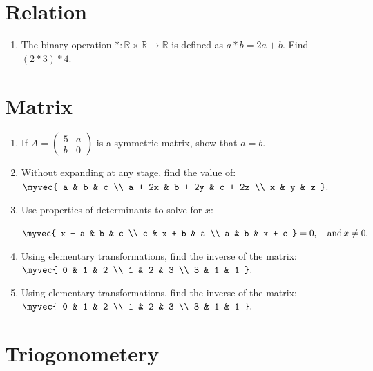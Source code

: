\documentclass[a4paper,12pt]{article}
\begin{document}
\section{Relation}

\begin{enumerate}
    

        \item The binary operation $\ast : \mathbb{R} \times \mathbb{R} \rightarrow \mathbb{R}$ is defined as $a \ast b = 2a + b$. Find $(2 \ast 3) \ast 4$.
\end{enumerate}

\section{Matrix}

\begin{enumerate}
		\item If $A = \begin{pmatrix} 5 & a \\ b & 0 \end{pmatrix}$ is a symmetric matrix, show that $a = b$.
        \item Without expanding at any stage, find the value of:    \\

        $ \myvec{ a & b & c \\ a + 2x & b + 2y & c + 2z \\ x & y & z }. $
\item
    Use properties of determinants to solve for $x$:
 
		$ \myvec{ x + a & b & c \\ c & x + b & a \\ a & b & x + c } = 0, \quad \text{and} \, x \neq 0. $


		\item Using elementary transformations, find the inverse of the matrix:
        $ \myvec{ 0 & 1 & 2 \\ 1 & 2 & 3 \\ 3 & 1 & 1 }. $

	\item Using elementary transformations, find the inverse of the matrix:
        $ \myvec{ 0 & 1 & 2 \\ 1 & 2 & 3 \\ 3 & 1 & 1 }. $

	\end{enumerate}


\section{Triogonometery}
\end{document}
